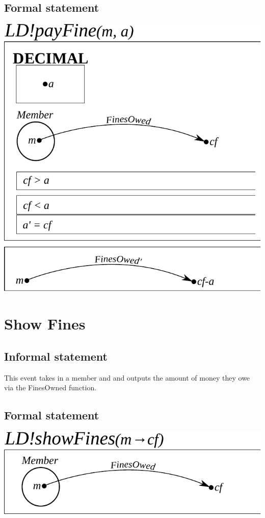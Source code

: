\documentclass[]{report}
\begin{document}
\subsection{Formal statement}
\begin{center}
	\includegraphics{pay_fine.pdf}
\end{center}
\newpage
\section{Show Fines}
\subsection{Informal statement}
This event takes in a member and and outputs the amount of money they owe via the FinesOwned function.
\subsection{Formal statement}
\begin{center}
	\includegraphics{show_fines.pdf}
\end{center}
\newpage
\end{document}
